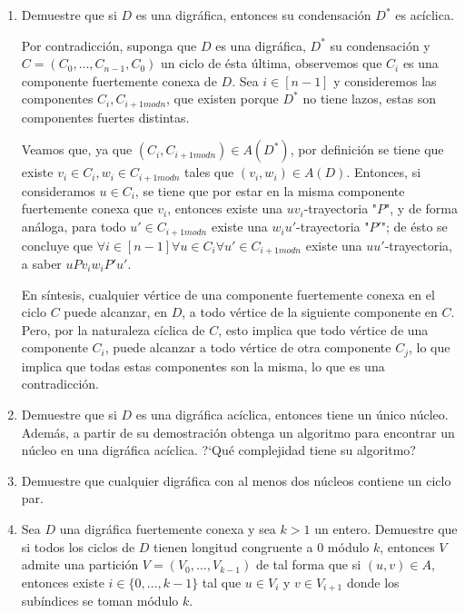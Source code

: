 \documentclass{article}
\begin{document}
\begin{enumerate}
  \item Demuestre que si $D$ es una digr\'afica, entonces su
    condensaci\'on $D^\ast$ es ac\'iclica.

    Por contradicción, suponga que $D$ es una digráfica, $D^\ast$ su condensación y $C=(C_0,\dots,C_{n-1},C_0)$ un ciclo de ésta última, observemos que $C_i$ es una componente fuertemente conexa de $D$. Sea $i\in[n-1]$ y consideremos las componentes $C_i,C_{i+1 mod n}$, que existen porque $D^\ast$ no tiene lazos, estas son componentes fuertes distintas.

    Veamos que, ya que $(C_i, C_{i+1 modn})\in A(D^\ast)$, por definición se tiene que existe $v_i\in C_i, w_i\in C_{i+1 modn}$ tales que $(v_i,w_i)\in A(D)$. Entonces, si consideramos $u\in C_i$, se tiene que por estar en la misma componente fuertemente conexa que $v_i$, entonces existe una $uv_i$-trayectoria "$P$", y de forma análoga, para todo $u'\in C_{i+1 modn}$ existe una $w_iu'$-trayectoria "$P'$"; de ésto se concluye que $\forall i\in[n-1]\forall u\in C_i \forall u'\in C_{i+1 modn}$ existe una $uu'$-trayectoria, a saber $uPv_iw_iP'u'$.

  En síntesis, cualquier vértice de una componente fuertemente conexa en el ciclo $C$ puede alcanzar, en $D$, a todo vértice de la siguiente componente en $C$. Pero, por la naturaleza cíclica de $C$, esto implica que todo vértice de una componente $C_i$, puede alcanzar a todo vértice de otra componente $C_j$, lo que implica que todas estas componentes son la misma, lo que es una contradicción.

  \item Demuestre que si $D$ es una digr\'afica ac\'iclica, entonces
    tiene un \'unico n\'ucleo.   Adem\'as, a partir de su demostraci\'on
    obtenga un algoritmo para encontrar un n\'ucleo en una digr\'afica
    ac\'iclica.   ?`Qu\'e complejidad tiene su algoritmo?

  \item Demuestre que cualquier digr\'afica con al menos dos n\'ucleos
    contiene un ciclo par.

  \item Sea $D$ una digr\'afica fuertemente conexa y sea $k > 1$ un entero.
    Demuestre que si todos los ciclos de $D$ tienen longitud congruente a
    $0$ m\'odulo $k$, entonces $V$ admite una partici\'on $V = (V_0, \dots,
    V_{k-1})$ de tal forma que si $(u,v) \in A$, entonces existe $i \in
    \{ 0, \dots, k-1 \}$ tal que $u \in V_i$ y $v \in V_{i+1}$ donde los
    sub\'indices se toman m\'odulo $k$.


\end{enumerate}
\end{document}

